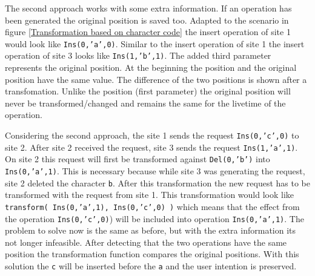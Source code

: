 \begin{itemize}
The second approach works with some extra information. If an operation has been generated the original position is saved too. Adapted to the scenario in figure \ref{Transformation based on character code} the insert operation of site 1 would look like \texttt{Ins(0,'a',0)}. Similar to the insert operation of site 1 the insert operation of site 3 looks like \texttt{Ins(1,'b',1)}. The added third parameter represents the original position. At the beginning the position and the original position have the same value. The difference of the two positions is shown after a transfomation. Unlike the position (first parameter) the original position will never be transformed/changed and remains the same for the livetime of the operation.

Considering the second approach, the site 1 sends the request \texttt{Ins(0,'c',0)} to site 2. After site 2 received the request, site 3 sends the request \texttt{Ins(1,'a',1)}. On site 2 this request will first be transformed against \texttt{Del(0,'b')} into \texttt{Ins(0,'a',1)}. This is necessary because while site 3 was generating the request, site 2 deleted the character \texttt{b}. After this transformation the new request has to be transformed with the request from site 1. This transformation would look like \texttt{transform( Ins(0,'a',1), Ins(0,'c',0) )} which means that the effect from the operation \texttt{Ins(0,'c',0)}) will be included into operation \texttt{Ins(0,'a',1)}. The problem to solve now is the same as before, but with the extra information its not longer infeasible. After detecting that the two operations have the same position the transformation function compares the original positions. With this solution the \texttt{c} will be inserted before the \texttt{a} and the user intention is preserved.


\end{itemize}
